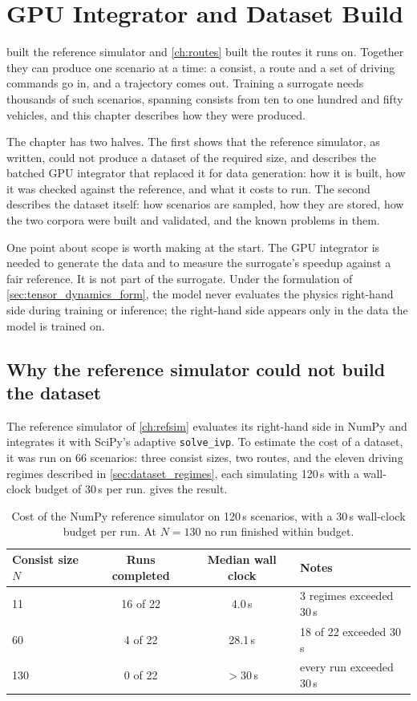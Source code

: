 \chapter{GPU Integrator and Dataset Build}
\label{ch:gpu_dataset}

 built the reference simulator and \cref{ch:routes} built the routes it runs on. Together they can produce one scenario at a time: a consist, a route and a set of driving commands go in, and a trajectory comes out. Training a surrogate needs thousands of such scenarios, spanning consists from ten to one hundred and fifty vehicles, and this chapter describes how they were produced.

The chapter has two halves. The first shows that the reference simulator, as written, could not produce a dataset of the required size, and describes the batched GPU integrator that replaced it for data generation: how it is built, how it was checked against the reference, and what it costs to run. The second describes the dataset itself: how scenarios are sampled, how they are stored, how the two corpora were built and validated, and the known problems in them.

One point about scope is worth making at the start. The GPU integrator is needed to generate the data and to measure the surrogate's speedup against a fair reference. It is not part of the surrogate. Under the formulation of \cref{sec:tensor_dynamics_form}, the model never evaluates the physics right-hand side during training or inference; the right-hand side appears only in the data the model is trained on.

\section{Why the reference simulator could not build the dataset}
\label{sec:gpu_why}

The reference simulator of \cref{ch:refsim} evaluates its right-hand side in NumPy and integrates it with SciPy's adaptive \texttt{solve\_ivp}. To estimate the cost of a dataset, it was run on 66 scenarios: three consist sizes, two routes, and the eleven driving regimes described in \cref{sec:dataset_regimes}, each simulating 120\,s with a wall-clock budget of 30\,s per run.  gives the result.

\begin{table}[htbp]
    \centering
    \begin{tabular}{lccl}
        \toprule
        Consist size $N$ & Runs completed & Median wall clock & Notes \\
        \midrule
        11  & 16 of 22 & 4.0\,s   & 3 regimes exceeded 30\,s \\
        60  & 4 of 22  & 28.1\,s  & 18 of 22 exceeded 30\,s \\
        130 & 0 of 22  & $>30$\,s & every run exceeded 30\,s \\
        \bottomrule
    \end{tabular}
    \caption{Cost of the NumPy reference simulator on 120\,s scenarios, with a 30\,s wall-clock budget per run. At $N = 130$ no run finished within budget.}
    \label{tab:numpy_benchmark}
\end{table}

